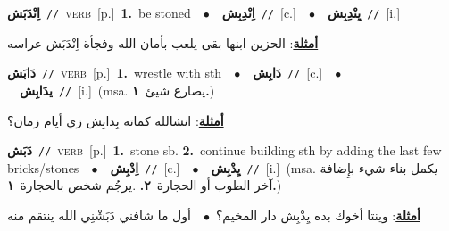 \documentclass[10pt,a4paper,twoside]{article} %
\begin{document}
\begin{multicols}{2}
{\setlength\topsep{0pt}\textbf{\foreignlanguage{arabic}{اِنْدَبَش}}\ {\color{gray}\texttt{//}\color{black}}\ \textsc{verb}\ [p.]\ \textbf{1.}~be stoned\ \ $\bullet$\ \ \setlength\topsep{0pt}\textbf{\foreignlanguage{arabic}{اِنْدِبِش}}\ {\color{gray}\texttt{//}\color{black}}\ [c.]\ \ $\bullet$\ \ \setlength\topsep{0pt}\textbf{\foreignlanguage{arabic}{يِنْدِبِش}}\ {\color{gray}\texttt{//}\color{black}}\ [i.]\  \begin{flushright}\color{gray}\foreignlanguage{arabic}{\textbf{\underline{\foreignlanguage{arabic}{أمثلة}}}: الحزين ابنها بقى يلعب بأمان الله وفجأة اِنْدَبَش عراسه}\end{flushright}\color{black}} \vspace{2mm}

{\setlength\topsep{0pt}\textbf{\foreignlanguage{arabic}{دَابَش}}\ {\color{gray}\texttt{//}\color{black}}\ \textsc{verb}\ [p.]\ \textbf{1.}~wrestle with sth\ \ $\bullet$\ \ \setlength\topsep{0pt}\textbf{\foreignlanguage{arabic}{دَابِش}}\ {\color{gray}\texttt{//}\color{black}}\ [c.]\ \ $\bullet$\ \ \setlength\topsep{0pt}\textbf{\foreignlanguage{arabic}{يدَابِش}}\ {\color{gray}\texttt{//}\color{black}}\ [i.]\ \color{gray}(msa. \foreignlanguage{arabic}{يصارع شيئ}~\foreignlanguage{arabic}{\textbf{١.}})\color{black}\  \begin{flushright}\color{gray}\foreignlanguage{arabic}{\textbf{\underline{\foreignlanguage{arabic}{أمثلة}}}: انشالله كماته بِدابِش زي أيام زمان؟}\end{flushright}\color{black}} \vspace{2mm}

{\setlength\topsep{0pt}\textbf{\foreignlanguage{arabic}{دَبَش}}\ {\color{gray}\texttt{//}\color{black}}\ \textsc{verb}\ [p.]\ \textbf{1.}~stone sb.  \textbf{2.}~continue building sth by adding the last few bricks/stones\ \ $\bullet$\ \ \setlength\topsep{0pt}\textbf{\foreignlanguage{arabic}{اِدْبِش}}\ {\color{gray}\texttt{//}\color{black}}\ [c.]\ \ $\bullet$\ \ \setlength\topsep{0pt}\textbf{\foreignlanguage{arabic}{يِدْبِش}}\ {\color{gray}\texttt{//}\color{black}}\ [i.]\ \color{gray}(msa. \foreignlanguage{arabic}{يكمل بناء شيء بإِضافة آخر الطوب أو الحجارة}~\foreignlanguage{arabic}{\textbf{٢.}}  .\foreignlanguage{arabic}{يرجُم شخص بالحجارة}~\foreignlanguage{arabic}{\textbf{١.}})\color{black}\  \begin{flushright}\color{gray}\foreignlanguage{arabic}{\textbf{\underline{\foreignlanguage{arabic}{أمثلة}}}: وينتا أخوك بده يِدْبِش دار المخيم؟\ $\bullet$\ \  أول ما شافني دَبَشْنِي الله ينتقم منه}\end{flushright}\color{black}} \vspace{2mm}


\end{multicols}
\end{document}
